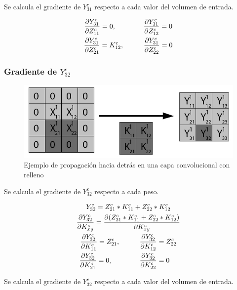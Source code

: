 Se calcula el gradiente de $Y^c_{31}$ respecto a cada valor del volumen de entrada.

\begin{gather}
	\frac{\partial Y^c_{31}}{\partial Z^c_{11}} = 0, \hspace{14mm} \frac{\partial Y^c_{31}}{\partial Z^c_{12}} = 0\\
	\frac{\partial Y^c_{31}}{\partial Z^c_{21}} = K^c_{12}, \hspace{10mm} \frac{\partial Y^c_{31}}{\partial Z^c_{22}} = 0
\end{gather}


\subsubsection{Gradiente de $Y^c_{32}$}

\begin{figure}[H]
	\centering
	\includegraphics[width=0.8\linewidth]{imagenes/conv_back_padding_8.jpg} 
	\caption{Ejemplo de propagación hacia detrás en una capa convolucional con relleno}
\end{figure}

Se calcula el gradiente de $Y^c_{32}$ respecto a cada peso.

\begin{gather}
	Y^c_{32} = Z^c_{21} * K^c_{11} + Z^c_{22} * K^c_{12} \\
	\frac{\partial Y^c_{32}}{\partial K^c_{xy}} = \frac{\partial (Z^c_{21} * K^c_{11} + Z^c_{22} * K^c_{12})}{\partial K^c_{xy}} \\
	\frac{\partial Y^c_{32}}{\partial K^c_{11}} = Z^c_{21}, \hspace{10mm} \frac{\partial Y^c_{32}}{\partial K^c_{12}} = Z^c_{22} \\
	\frac{\partial Y^c_{32}}{\partial K^c_{21}} = 0, \hspace{14mm} \frac{\partial Y^c_{32}}{\partial K^c_{22}} = 0 \hspace{4mm}
\end{gather}

Se calcula el gradiente de $Y^c_{32}$ respecto a cada valor del volumen de entrada.

